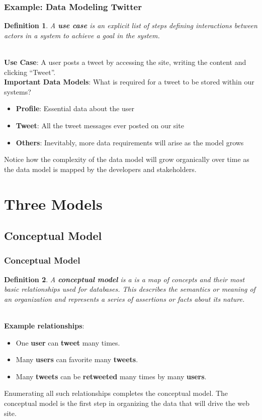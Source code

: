 \documentclass[aspectratio=169]{beamer}
\newtheorem{defn}{Definition}
\begin{document}
\begin{frame}
\frametitle{Example: Data Modeling Twitter}
\begin{defn}
A \textbf{use case} is an explicit list of steps defining interactions between actors in a system to achieve a \textit{goal} in the system.
\end{defn}
\pause
\mbox{}\\
\textbf{Use Case}: A user posts a tweet by accessing the site, writing the content and clicking ``Tweet''.
\pause
\mbox{}\\
\textbf{Important Data Models}: What is required for a tweet to be stored within our systems?
\begin{itemize}
	\item \textbf{Profile}: Essential data about the user
	\item \textbf{Tweet}: All the tweet messages ever posted on our site
	\item \textbf{Others}: Inevitably, more data requirements will arise as the model grows
\end{itemize}
Notice how the complexity of the data model will grow organically over time as the data model is mapped by the developers and stakeholders.
\end{frame}

\section{Three Models}
\subsection{Conceptual Model}
\begin{frame}
\frametitle{Conceptual Model}
\begin{defn}
A \textbf{conceptual model} is a is a map of concepts and their most basic relationships used for databases. This describes the semantics or meaning of an organization and represents a series of assertions or facts about its nature.
\end{defn}
\pause
\mbox{}\\
\textbf{Example relationships}:
\begin{itemize}
	\item One \textbf{user} can \textbf{tweet} many times.
	\item Many \textbf{users} can favorite many \textbf{tweets}.
	\item Many \textbf{tweets} can be \textbf{retweeted} many times by many \textbf{users}.
\end{itemize}
Enumerating all such relationships completes the conceptual model. The conceptual model is the first step in organizing the data that will drive the web site.
\end{frame}
\end{document}
